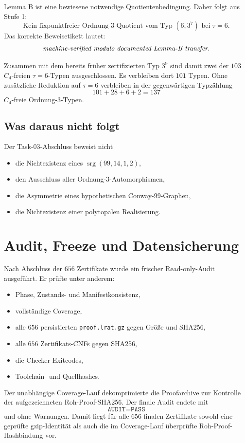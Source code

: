 \documentclass[11pt,a4paper]{article}
\newcommand{\srg}{\operatorname{srg}}
\newcommand{\code}[1]{\texttt{#1}}
\begin{document}
Lemma B ist eine bewiesene notwendige Quotientenbedingung. Daher folgt aus Stufe 1:
\[
\boxed{\text{Kein fixpunktfreier Ordnung-$3$-Quotient vom Typ $(6,3^7)$ bei $\tau=6$.}}
\]
Das korrekte Beweisetikett lautet:
\[
\text{\emph{machine-verified modulo documented Lemma-B transfer}.}
\]

Zusammen mit dem bereits früher zertifizierten Typ $3^9$ sind damit zwei der $103$ $C_4$-freien $\tau=6$-Typen ausgeschlossen. Es verbleiben dort $101$ Typen. Ohne zusätzliche Reduktion auf $\tau=6$ verbleiben in der gegenwärtigen Typzählung
\[
101+28+6+2=137
\]
$C_4$-freie Ordnung-$3$-Typen.

\subsection{Was daraus nicht folgt}

Der Task-03-Abschluss beweist nicht
\begin{itemize}[nosep]
\item die Nichtexistenz eines $\srg(99,14,1,2)$,
\item den Ausschluss aller Ordnung-$3$-Automorphismen,
\item die Asymmetrie eines hypothetischen Conway-99-Graphen,
\item die Nichtexistenz einer polytopalen Realisierung.
\end{itemize}

\section{Audit, Freeze und Datensicherung}

Nach Abschluss der $656$ Zertifikate wurde ein frischer Read-only-Audit ausgeführt. Er prüfte unter anderem:
\begin{itemize}[nosep]
\item Phase, Zustands- und Manifestkonsistenz,
\item vollständige Coverage,
\item alle $656$ persistierten \code{proof.lrat.gz} gegen Größe und SHA256,
\item alle $656$ Zertifikats-CNFs gegen SHA256,
\item die Checker-Exitcodes,
\item Toolchain- und Quellhashes.
\end{itemize}

Der unabhängige Coverage-Lauf dekomprimierte die Proofarchive zur Kontrolle der aufgezeichneten Roh-Proof-SHA256. Der finale Audit endete mit
\[
\boxed{\code{AUDIT=PASS}}
\]
und ohne Warnungen. Damit liegt für alle $656$ finalen Zertifikate sowohl eine geprüfte gzip-Identität als auch die im Coverage-Lauf überprüfte Roh-Proof-Hashbindung vor.
\end{document}
